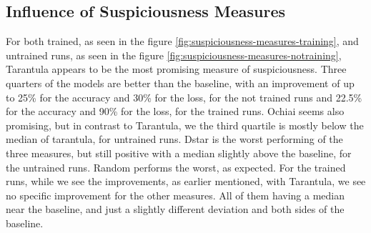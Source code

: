 \subsection{Influence of Suspiciousness Measures}\label{subsec:influence-of-suspiciousness-measures}
For both trained, as seen in the figure \ref{fig:suspiciousness-measures-training}, and untrained runs, as seen in the figure \ref{fig:suspiciousness-measures-notraining}, Tarantula appears to be the most promising measure of suspiciousness.
Three quarters of the models are better than the baseline, with an improvement of up to 25\% for the accuracy and 30\% for the loss, for the not trained runs and 22.5\% for the accuracy and 90\% for the loss, for the trained runs.
Ochiai seems also promising, but in contrast to Tarantula, we the third quartile is mostly below the median of tarantula, for untrained runs.
Dstar is the worst performing of the three measures, but still positive with a median slightly above the baseline, for the untrained runs.
Random performs the worst, as expected.
For the trained runs, while we see the improvements, as earlier mentioned, with Tarantula, we see no specific improvement for the other measures.
All of them having a median near the baseline, and just a slightly different deviation and both sides of the baseline.
